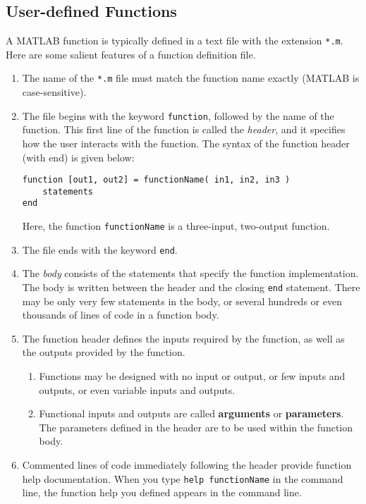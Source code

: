 \subsection{User-defined Functions}
A MATLAB function is typically defined in a text file with the extension \texttt{*.m}. Here are some salient features of a function definition file.

\begin{enumerate}
\item The name of the \texttt{*.m} file must match the function name exactly (MATLAB is case-sensitive).
\item The file begins with the keyword \texttt{function}, followed by the name of the function. This first line of the function is called the \textit{header}, and it specifies how the user interacts with the function. The syntax of the function header (with end) is given below:
\begin{lstlisting}[style=Matlab-editor]
function [out1, out2] = functionName( in1, in2, in3 )
	statements
end
\end{lstlisting}
Here, the function \texttt{functionName} is a three-input, two-output function.
\item The file ends with the keyword \texttt{end}.
\item The \textit{body} consists of the statements that specify the function implementation. The body is written between the header and the closing \texttt{end} statement. There may be only very few statements in the body, or several hundreds or even thousands of lines of code in a function body.
\item The function header defines the inputs required by the function, as well as the outputs provided by the function.
\begin{enumerate}
\item Functions may be designed with no input or output, or few inputs and outputs, or even variable inputs and outputs.
\item Functional inputs and outputs are called \textbf{arguments} or \textbf{parameters}. The parameters defined in the header are to be used within the function body.
\end{enumerate}
\item Commented lines of code immediately following the header provide function help documentation. When you type \texttt{help functionName} in the command line, the function help you defined appears in the command line.
\end{enumerate}

